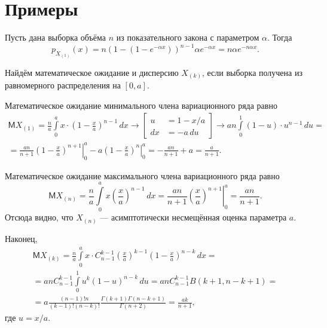 \section{Примеры}
\begin{ex}
	Пусть дана выборка объёма $ n $ из показательного закона с параметром $ \alpha
	$. Тогда
	\[
		p_{X_{(1)}}(x) = n(1 - (1 - e^{-\alpha x}))^{n-1} \alpha e^{-\alpha
		x} = n \alpha e^{-n\alpha x}.
	\]
\end{ex}
\begin{ex}
	Найдём математическое ожидание и дисперсию $ X_{(k)} $, если выборка получена
	из равномерного распределения на $ [0, a] $. 

	Математическое ожидание минимального члена вариационного ряда равно
	\begin{multline*}
		\mathsf M X_{(1)} = \frac{n}{a }\int\limits_{0}^{a} x\cdot \left( 1 - \frac{x}{a}
		\right)^{n-1}\,dx \to \left[ \begin{aligned} u &= 1 - x/a \\ dx &= -a\,du
		\end{aligned}\right] \to an \int\limits_{0}^{1} \left( 1 - u \right) \cdot
		u^{n-1}\,du =\\=
		\frac{an}{n+1} \left. \left( 1 - \frac{x}{a} \right)^{n+1} \right|^a_0 - a
			\left.\left( 1 - \frac{x}{a} \right)^n \right|^a_0 = - \frac{an}{n+1} + a
				= \frac{a}{n+1}.
	\end{multline*}
	
	Математическое ожидание максимального члена вариационного ряда равно 
	\[
	\mathsf M X_{(n)} = \frac{n}{a}\int\limits_{0}^{a} x
	\left(\frac{x}{a}\right)^{n-1}\,dx = \frac{an}{n+1} \left.\left( \frac{x}{a}
	\right)^{n+1} \right|^a_0 = \frac{an}{n+1}.
	\]
	Отсюда видно, что $ X_{(n)} $ --- асимптотически несмещённая оценка параметра
	$ a $.

	Наконец, 
	\begin{multline*}
		\mathsf M X_{(k)} = \frac{n}{a}\int\limits_{0}^{a} x\cdot C^{k-1}_{n-1}
		\left(\frac{x}{a}\right)^{k-1} \left( 1 - \frac{x}{a} \right)^{n-k}\,dx = \\
		= an C^{k-1}_{n-1} \int\limits_{0}^{1}
		u^k(1-u)^{n-k}\,du = 
		an C^{k-1}_{n-1} B(k+1, n-k+1)  = \\ = a \frac{(n-1)!n}{(k-1)! (n-k)!}
		\frac{\Gamma(k+1) \Gamma(n-k+1)}{\Gamma(n+2)} = \frac{ak}{n+1},
	\end{multline*}
	где $ u = x/a $.
\end{ex}
